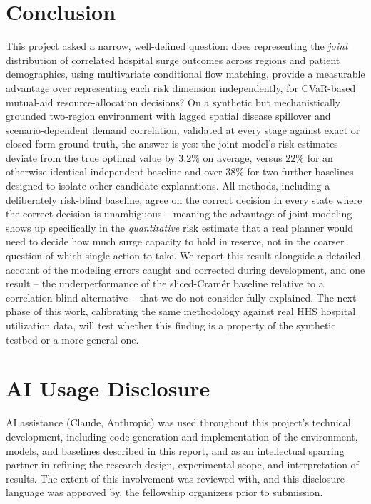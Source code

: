 \documentclass[11pt]{article}
\begin{document}
\section{Conclusion}

This project asked a narrow, well-defined question: does representing the \emph{joint} distribution of correlated hospital surge outcomes across regions and patient demographics, using multivariate conditional flow matching, provide a measurable advantage over representing each risk dimension independently, for CVaR-based mutual-aid resource-allocation decisions? On a synthetic but mechanistically grounded two-region environment with lagged spatial disease spillover and scenario-dependent demand correlation, validated at every stage against exact or closed-form ground truth, the answer is yes: the joint model's risk estimates deviate from the true optimal value by $3.2\%$ on average, versus $22\%$ for an otherwise-identical independent baseline and over $38\%$ for two further baselines designed to isolate other candidate explanations. All methods, including a deliberately risk-blind baseline, agree on the correct decision in every state where the correct decision is unambiguous -- meaning the advantage of joint modeling shows up specifically in the \emph{quantitative} risk estimate that a real planner would need to decide how much surge capacity to hold in reserve, not in the coarser question of which single action to take. We report this result alongside a detailed account of the modeling errors caught and corrected during development, and one result -- the underperformance of the sliced-Cram\'er baseline relative to a correlation-blind alternative -- that we do not consider fully explained. The next phase of this work, calibrating the same methodology against real HHS hospital utilization data, will test whether this finding is a property of the synthetic testbed or a more general one.

\section*{AI Usage Disclosure}
AI assistance (Claude, Anthropic) was used throughout this project's technical development, including code generation and implementation of the environment, models, and baselines described in this report, and as an intellectual sparring partner in refining the research design, experimental scope, and interpretation of results. The extent of this involvement was reviewed with, and this disclosure language was approved by, the fellowship organizers prior to submission.
\end{document}
